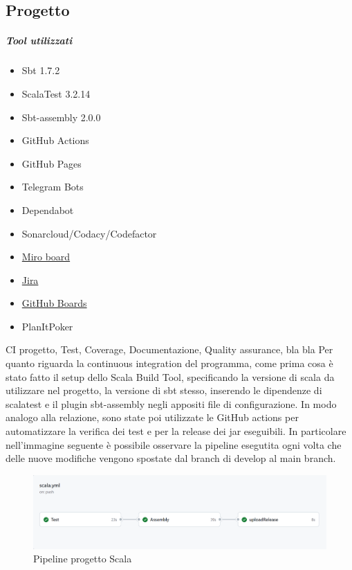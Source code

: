     \subsection{Progetto}
        \subparagraph{Tool utilizzati}
        \begin{itemize}
            \item Sbt 1.7.2
            \item ScalaTest 3.2.14
            \item Sbt-assembly 2.0.0
            \item GitHub Actions
            \item GitHub Pages
            \item Telegram Bots
            \item Dependabot
            \item Sonarcloud/Codacy/Codefactor
            \item \href{https://miro.com/app/board/uXjVPN93uLs=/?share_link_id=56431555728}{Miro board}
            \item  \href{https://riccardo-omiccioli.atlassian.net/jira/software/projects/IQ/boards/1/roadmap}{Jira}
            \item  \href{https://github.com/orgs/ISIQuiz/projects/3}{GitHub Boards}
            \item  PlanItPoker \cite{planitpoker}
        \end{itemize}
    CI progetto, Test, Coverage, Documentazione, Quality assurance, bla bla
    Per quanto riguarda la continuous integration del programma, come prima cosa è stato fatto il setup dello Scala Build Tool, specificando la versione di scala da utilizzare nel progetto, la versione di sbt stesso, inserendo le dipendenze di scalatest e il plugin sbt-assembly negli appositi file di configurazione. In modo analogo alla relazione, sono state poi utilizzate le GitHub actions per automatizzare la verifica dei test e per la release dei jar eseguibili. In particolare nell'immagine seguente è possibile osservare la pipeline esegutita ogni volta che delle nuove modifiche vengono spostate dal branch di develop al main branch.

    \begin{figure}[H]
        \caption{Pipeline progetto Scala}
        \label{fig:scala-ci-github}
        \centering
        \includegraphics[width=1\textwidth]{Images/scalaCI-pipeline.png}
    \end{figure}

